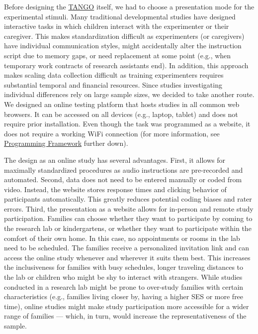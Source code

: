 \documentclass[
]{scrbook}
\begin{document}
Before designing the \hyperref[acronyms_TANGO]{TANGO} itself, we had to choose a presentation mode for the experimental stimuli. Many traditional developmental studies have designed interactive tasks in which children interact with the experimenter or their caregiver. This makes standardization difficult as experimenters (or caregivers) have individual communication styles, might accidentally alter the instruction script due to memory gaps, or need replacement at some point (e.g., when temporary work contracts of research assistants end). In addition, this approach makes scaling data collection difficult as training experimenters requires substantial temporal and financial resources. Since studies investigating individual differences rely on large sample sizes, we decided to take another route. We designed an online testing platform that hosts studies in all common web browsers. It can be accessed on all devices (e.g., laptop, tablet) and does not require prior installation. Even though the task was programmed as a website, it does not require a working WiFi connection (for more information, see \hyperref[programmingframework]{Programming Framework} further down).

The design as an online study has several advantages. First, it allows for maximally standardized procedures as audio instructions are pre-recorded and automated. Second, data does not need to be entered manually or coded from video. Instead, the website stores response times and clicking behavior of participants automatically. This greatly reduces potential coding biases and rater errors. Third, the presentation as a website allows for in-person and remote study participation. Families can choose whether they want to participate by coming to the research lab or kindergartens, or whether they want to participate within the comfort of their own home. In this case, no appointments or rooms in the lab need to be scheduled. The families receive a personalized invitation link and can access the online study whenever and wherever it suits them best. This increases the inclusiveness for families with busy schedules, longer traveling distances to the lab or children who might be shy to interact with strangers. While studies conducted in a research lab might be prone to over-study families with certain characteristics (e.g., families living closer by, having a higher SES or more free time), online studies might make study participation more accessible for a wider range of families --- which, in turn, would increase the representativeness of the sample.
\end{document}
